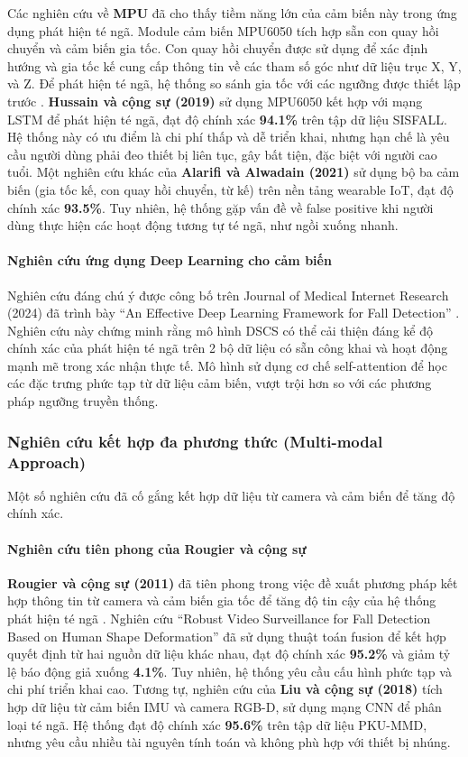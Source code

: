 Các nghiên cứu về \textbf{MPU} đã cho thấy tiềm năng lớn của cảm biến này trong ứng dụng phát hiện té ngã. Module cảm biến MPU6050 tích hợp sẵn con quay hồi chuyển và cảm biến gia tốc. Con quay hồi chuyển được sử dụng để xác định hướng và gia tốc kế cung cấp thông tin về các tham số góc như dữ liệu trục X, Y, và Z. Để phát hiện té ngã, hệ thống so sánh gia tốc với các ngưỡng được thiết lập trước \cite{iotproject2024}. \textbf{Hussain và cộng sự (2019)} sử dụng MPU6050 kết hợp với mạng LSTM để phát hiện té ngã, đạt độ chính xác \textbf{94.1\%} trên tập dữ liệu SISFALL. Hệ thống này có ưu điểm là chi phí thấp và dễ triển khai, nhưng hạn chế là yêu cầu người dùng phải đeo thiết bị liên tục, gây bất tiện, đặc biệt với người cao tuổi. Một nghiên cứu khác của \textbf{Alarifi và Alwadain (2021)} sử dụng bộ ba cảm biến (gia tốc kế, con quay hồi chuyển, từ kế) trên nền tảng wearable IoT, đạt độ chính xác \textbf{93.5\%}. Tuy nhiên, hệ thống gặp vấn đề về false positive khi người dùng thực hiện các hoạt động tương tự té ngã, như ngồi xuống nhanh.

\paragraph{Nghiên cứu ứng dụng Deep Learning cho cảm biến}
Nghiên cứu đáng chú ý được công bố trên Journal of Medical Internet Research (2024) đã trình bày ``An Effective Deep Learning Framework for Fall Detection'' \cite{chen2024}. Nghiên cứu này chứng minh rằng mô hình DSCS có thể cải thiện đáng kể độ chính xác của phát hiện té ngã trên 2 bộ dữ liệu có sẵn công khai và hoạt động mạnh mẽ trong xác nhận thực tế. Mô hình sử dụng cơ chế self-attention để học các đặc trưng phức tạp từ dữ liệu cảm biến, vượt trội hơn so với các phương pháp ngưỡng truyền thống.

\subsubsection{Nghiên cứu kết hợp đa phương thức (Multi-modal Approach)}
Một số nghiên cứu đã cố gắng kết hợp dữ liệu từ camera và cảm biến để tăng độ chính xác.

\paragraph{Nghiên cứu tiên phong của Rougier và cộng sự}
\textbf{Rougier và cộng sự (2011)} đã tiên phong trong việc đề xuất phương pháp kết hợp thông tin từ camera và cảm biến gia tốc để tăng độ tin cậy của hệ thống phát hiện té ngã \cite{rougier2011}. Nghiên cứu ``Robust Video Surveillance for Fall Detection Based on Human Shape Deformation'' đã sử dụng thuật toán fusion để kết hợp quyết định từ hai nguồn dữ liệu khác nhau, đạt độ chính xác \textbf{95.2\%} và giảm tỷ lệ báo động giả xuống \textbf{4.1\%}. Tuy nhiên, hệ thống yêu cầu cấu hình phức tạp và chi phí triển khai cao. Tương tự, nghiên cứu của \textbf{Liu và cộng sự (2018)} tích hợp dữ liệu từ cảm biến IMU và camera RGB-D, sử dụng mạng CNN để phân loại té ngã. Hệ thống đạt độ chính xác \textbf{95.6\%} trên tập dữ liệu PKU-MMD, nhưng yêu cầu nhiều tài nguyên tính toán và không phù hợp với thiết bị nhúng.

